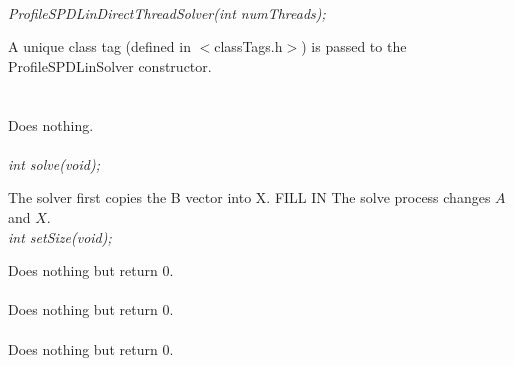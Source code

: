   \\
{\em ProfileSPDLinDirectThreadSolver(int numThreads);}  

A unique class tag (defined in $<$classTags.h$>$) is passed to the
ProfileSPDLinSolver constructor. \\


 \\
\\ 
Does nothing. \\

  \\
{\em  int solve(void);} 

The solver first copies the B vector into X.
FILL IN
The solve process changes $A$ and $X$. \\   

{\em  int setSize(void);} 

Does nothing but return $0$. \\

 \\ 
Does nothing but return $0$. \\

 \\ 
Does nothing but return $0$. \\







